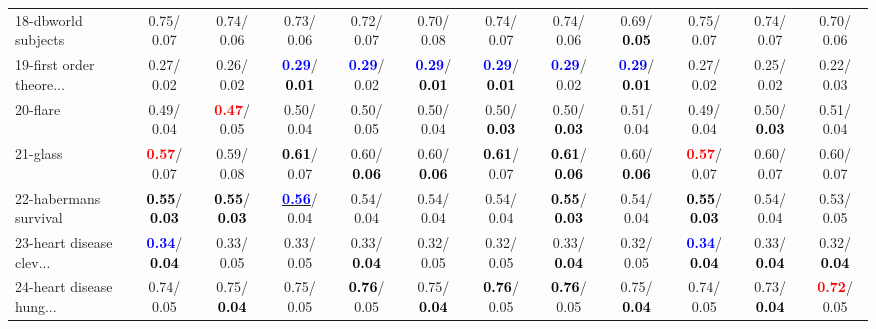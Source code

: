 \begin{table}[h]
\begin{center}
{\begin{tabular}{lc|c|c|c|c|c|c|c|c|c|c}
18-dbworld subjects &   0.75/  0.07 &   0.74/  0.06 &   0.73/  0.06 &   0.72/  0.07 &   0.70/  0.08 &   0.74/  0.07 &   0.74/  0.06 &   0.69/\textcolor{black}{\textbf{  0.05}} &   0.75/  0.07 &   0.74/  0.07 &   0.70/  0.06 \\
19-first order theore... &   0.27/  0.02 &   0.26/  0.02 & \textcolor{blue}{\textbf{  0.29}}/\textcolor{black}{\textbf{  0.01}} & \textcolor{blue}{\textbf{  0.29}}/  0.02 & \textcolor{blue}{\textbf{  0.29}}/\textcolor{black}{\textbf{  0.01}} & \textcolor{blue}{\textbf{  0.29}}/\textcolor{black}{\textbf{  0.01}} & \textcolor{blue}{\textbf{  0.29}}/  0.02 & \textcolor{blue}{\textbf{  0.29}}/\textcolor{black}{\textbf{  0.01}} &   0.27/  0.02 &   0.25/  0.02 &   0.22/  0.03 \\
20-flare &   0.49/  0.04 & \textcolor{red}{\textbf{  0.47}}/  0.05 &   0.50/  0.04 &   0.50/  0.05 &   0.50/  0.04 &   0.50/\textcolor{black}{\textbf{  0.03}} &   0.50/\textcolor{black}{\textbf{  0.03}} &   0.51/  0.04 &   0.49/  0.04 &   0.50/\textcolor{black}{\textbf{  0.03}} &   0.51/  0.04 \\
21-glass & \textcolor{red}{\textbf{  0.57}}/  0.07 &   0.59/  0.08 & \textcolor{black}{\textbf{  0.61}}/  0.07 &   0.60/\textcolor{black}{\textbf{  0.06}} &   0.60/\textcolor{black}{\textbf{  0.06}} & \textcolor{black}{\textbf{  0.61}}/  0.07 & \textcolor{black}{\textbf{  0.61}}/\textcolor{black}{\textbf{  0.06}} &   0.60/\textcolor{black}{\textbf{  0.06}} & \textcolor{red}{\textbf{  0.57}}/  0.07 &   0.60/  0.07 &   0.60/  0.07 \\ \hline
22-habermans survival & \textcolor{black}{\textbf{  0.55}}/\textcolor{black}{\textbf{  0.03}} & \textcolor{black}{\textbf{  0.55}}/\textcolor{black}{\textbf{  0.03}} & \underline{\textcolor{blue}{\textbf{  0.56}}}/  0.04 &   0.54/  0.04 &   0.54/  0.04 &   0.54/  0.04 & \textcolor{black}{\textbf{  0.55}}/\textcolor{black}{\textbf{  0.03}} &   0.54/  0.04 & \textcolor{black}{\textbf{  0.55}}/\textcolor{black}{\textbf{  0.03}} &   0.54/  0.04 &   0.53/  0.05 \\
23-heart disease clev... & \textcolor{blue}{\textbf{  0.34}}/\textcolor{black}{\textbf{  0.04}} &   0.33/  0.05 &   0.33/  0.05 &   0.33/\textcolor{black}{\textbf{  0.04}} &   0.32/  0.05 &   0.32/  0.05 &   0.33/\textcolor{black}{\textbf{  0.04}} &   0.32/  0.05 & \textcolor{blue}{\textbf{  0.34}}/\textcolor{black}{\textbf{  0.04}} &   0.33/\textcolor{black}{\textbf{  0.04}} &   0.32/\textcolor{black}{\textbf{  0.04}} \\
24-heart disease hung... &   0.74/  0.05 &   0.75/\textcolor{black}{\textbf{  0.04}} &   0.75/  0.05 & \textcolor{black}{\textbf{  0.76}}/  0.05 &   0.75/\textcolor{black}{\textbf{  0.04}} & \textcolor{black}{\textbf{  0.76}}/  0.05 & \textcolor{black}{\textbf{  0.76}}/  0.05 &   0.75/\textcolor{black}{\textbf{  0.04}} &   0.74/  0.05 &   0.73/\textcolor{black}{\textbf{  0.04}} & \textcolor{red}{\textbf{  0.72}}/  0.05 \\

\end{tabular}}
\end{center}
\end{table}
